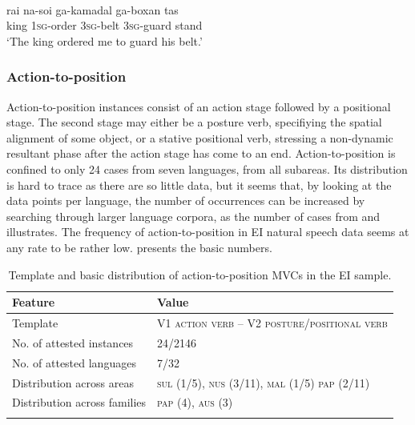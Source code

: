 \ea \label{Teiwa002}
\\
\gll rai na-soi ga-kamadal ga-boxan tas \\
king \textsc{1}\textsc{sg}-order \textsc{3}\textsc{sg}-belt \textsc{3}\textsc{sg}-guard stand \\
\glft `The king ordered me to guard his belt.'\\ 
\z

\subsubsection{Action-to-position}\label{sec:action-to-position}

Action-to-position instances consist of an action stage followed by a positional stage. The second stage may either be a posture verb, specifiying the spatial alignment of some object, or a stative positional verb, stressing a non-dynamic resultant phase after the action stage has come to an end. Action-to-position is confined to only 24 cases from seven languages, from all subareas. Its distribution is hard to trace as there are so little data, but it seems that, by looking at the data points per language, the number of occurrences can be increased by searching through larger language corpora, as the number of cases from  and  illustrates. The frequency of action-to-position in EI natural speech data seems at any rate to be rather low.  presents the basic numbers.

\begin{table}
\begin{tabular}{ll}
\lsptoprule
Feature&Value\tabularnewline
\midrule
Template&V1 \textsc{action verb} -- V2 \textsc{posture/positional verb}\tabularnewline
No. of attested instances& 24/2146 \tabularnewline
No. of attested languages& 7/32 \tabularnewline
Distribution across areas& \textsc{sul} (1/5), \textsc{nus} (3/11), \textsc{mal} (1/5) \textsc{pap} (2/11) \tabularnewline
Distribution across families& \textsc{pap} (4), \textsc{aus} (3) \tabularnewline
\lspbottomrule
\end{tabular}
\caption[Template and basic distribution of action-to-position MVCs]{Template and basic distribution of action-to-position MVCs in the EI sample.}
\label{table:action-to-position}
\end{table}


